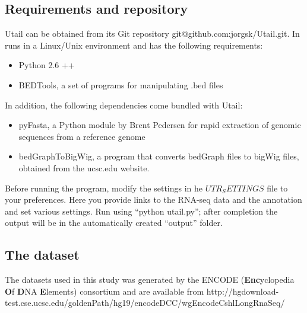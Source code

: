 \subsection{Requirements and repository}
Utail can be obtained from its Git repository git@github.com:jorgsk/Utail.git.
In runs in a Linux/Unix environment and has the following requirements:
\begin{itemize}
	\item Python 2.6 ++
	\item BEDTools, a set of programs for manipulating .bed files
		\cite{quinlan_bedtools:_2010}
\end{itemize}
In addition, the following dependencies come bundled with Utail:
\begin{itemize}
	\item pyFasta, a Python module by Brent Pedersen for rapid extraction of
		genomic sequences from a reference genome
	\item bedGraphToBigWig, a program that converts bedGraph files to bigWig
		files, obtained from the ucsc.edu website.
\end{itemize}
Before running the program, modify the settings in he $UTR_SETTINGS$ file to your
preferences. Here you provide links to the RNA-seq data and the annotation and
set various settings. Run using ``python utail.py''; after completion the
output will be in the automatically created ``output'' folder.

\subsection{The dataset}
The datasets used in this study was generated by the ENCODE
(\textbf{Enc}yclopedia \textbf{O}f \textbf{D}NA \textbf{E}lements) consortium
and are available from http://hgdownload-test.cse.ucsc.edu/goldenPath/hg19/encodeDCC/wgEncodeCshlLongRnaSeq/

